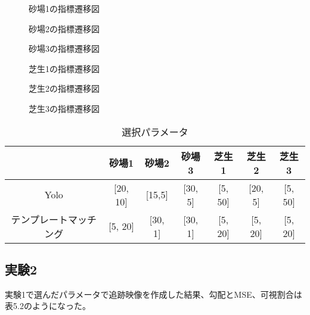 \documentclass[11pt,a4j]{jreport}
\begin{document}
\vspace{\baselineskip}
\begin{figure}[H]
    \centering
    \caption{砂場1の指標遷移図}
\end{figure}
\begin{figure}[H]
    \centering
    \caption{砂場2の指標遷移図}
\end{figure}
\begin{figure}[H]
    \centering
    \caption{砂場3の指標遷移図}
\end{figure}
\begin{figure}[H]
    \centering
    \caption{芝生1の指標遷移図}
\end{figure}
\begin{figure}[H]
    \centering
    \caption{芝生2の指標遷移図}
\end{figure}
\begin{figure}[H]
    \centering
    \caption{芝生3の指標遷移図}
\end{figure}

\begin{table}[htbp]
    \centering
    \caption{選択パラメータ}
    \label{tab:sandbox_grass}
    \begin{tabular}{c|cccccc}
                    & 砂場1      & 砂場2     & 砂場3     & 芝生1     & 芝生2     & 芝生3     \\ %
        \hline
        Yolo        & [20, 10] & [15,5]  & [30, 5] & [5, 50] & [20, 5] & [5, 50] \\
        テンプレートマッチング & [5, 20]  & [30, 1] & [30, 1] & [5, 20] & [5, 20] & [5, 20] \\
    \end{tabular}
\end{table}


\subsection{実験2}
実験1で選んだパラメータで追跡映像を作成した結果、勾配とMSE、可視割合は表5.2のようになった。\\
\end{document}
